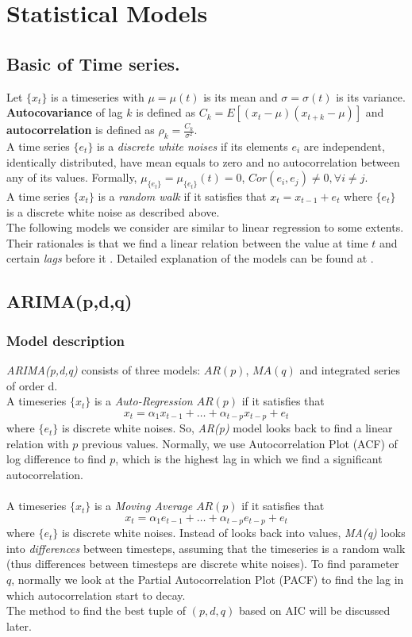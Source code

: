 \documentclass[11pt]{article}
\begin{document}
\section{Statistical Models}
\subsection{Basic of Time series.}
Let $\{x_t\}$ is a timeseries with $\mu=\mu(t)$ is its mean and
$\sigma=\sigma(t)$ is its variance. \textbf{Autocovariance} of lag $k$ is
defined as $C_k=E[(x_t-\mu)(x_{t+k}-\mu)]$ and \textbf{autocorrelation} is
defined
as $\rho_k=\frac{C_k}{\sigma^2}$.\\
A time series $\{e_t\}$ is a \textit{discrete white noises} if its elements
$e_i$ are independent, identically distributed, have mean equals to zero and no
autocorrelation between any of its values. Formally,
$\mu_{\{e_t\}}=\mu_{\{e_t\}}(t)=0$,
$Cor(e_i,e_j)\neq 0, \forall i \neq j$.\\
A time series $\{x_t\}$ is a \textit{random walk} if it satisfies that
$x_t=x_{t-1}+e_t$ where $\{e_t\}$ is a discrete white noise as described above.\\
The following models we consider are similar to linear regression to some
extents. Their rationales is that we find a linear relation between the
value at time $t$ and certain \textit{lags} before it . Detailed explanation of
the models can be found at \cite{GVK483463442}.

\subsection{ARIMA(p,d,q)}
\subsubsection{Model description}
\textit{ARIMA(p,d,q)} consists of three models: $AR(p)$, $MA(q)$ and integrated
series of order d.\\ 
A timeseries $\{x_t\}$ is a \textit{Auto-Regression} $AR(p)$ if it satisfies that
$$
x_t = \alpha_1x_{t-1} + \ldots + \alpha_{t-p}x_{t-p} + e_t 
$$
where $\{e_t\}$ is discrete white noises. So, \textit{AR(p)} model looks back to
find a linear relation with $p$ previous values. Normally, we use
Autocorrelation Plot (ACF) of log difference to find $p$, which is the highest
lag in which we find a significant autocorrelation.\\
\\
A timeseries $\{x_t\}$ is a \textit{Moving Average} $AR(p)$ if it satisfies that
$$
x_t = \alpha_1e_{t-1} + \ldots + \alpha_{t-p}e_{t-p} + e_t 
$$
where $\{e_t\}$ is discrete white noises. Instead of looks back into values,
\textit{MA(q)} looks into \textit{differences} between timesteps, assuming that
the timeseries is a random walk (thus differences between timesteps are discrete
white noises). To find parameter $q$, normally we look at the Partial
Autocorrelation Plot (PACF) to find the lag in which autocorrelation start to
decay.\\ The method to find the best tuple of $(p,d,q)$ based on AIC will
be discussed later.\\
\end{document}
